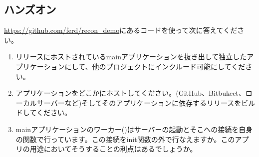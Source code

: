 \subsection*{ハンズオン}

\href{https://github.com/ferd/recon\_demo}{https://github.com/ferd/recon\_demo}にあるコードを使って次に答えてください。

\begin{enumerate}
  \item リリースにホストされているmainアプリケーションを抜き出して独立したアプリケーションにして、他のプロジェクトにインクルード可能にしてください。
  \item アプリケーションをどこかにホストしてください。(GitHub、Bitbukect、ローカルサーバーなど)そしてそのアプリケーションに依存するリリースをビルドしてください。
  \item mainアプリケーションのワーカー()はサーバーの起動とそこへの接続を自身の関数で行っています。この接続をinit関数の外で行なえますか。このアプリの用途においてそうすることの利点はあるでしょうか。
\end{enumerate}


